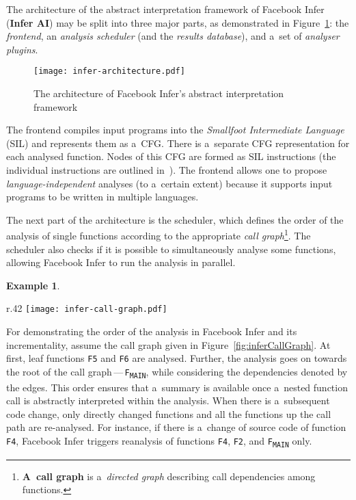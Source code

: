 \documentclass{ExcelAtFIT}
\theoremstyle{definition}
\newtheorem{example}{Example}[section]
\begin{document}
The architecture of the abstract interpretation framework of Facebook Infer (\textbf{Infer AI}) may be split into three major parts, as demonstrated in Figure~\ref{fig:inferArch}: the \emph{frontend}, an \emph{analysis scheduler} (and the \emph{results database}), and a~set of \emph{analyser plugins}.

\begin{figure}[hbt]
    \centering
    \texttt{[image: infer-architecture.pdf]}
    \caption{The architecture of Facebook Infer's abstract interpretation framework~\cite{harmimBP}}
    \label{fig:inferArch}
\end{figure}

The frontend compiles input programs into the \emph{Smallfoot Intermediate Language} (SIL) and represents them as a~CFG. There is a~separate CFG representation for each analysed function. Nodes of this CFG are formed as SIL instructions (the individual instructions are outlined in~\cite{harmimBP}). The frontend allows one to propose \emph{language-independent} analyses (to a~certain extent) because it supports input programs to be written in multiple languages.

The next part of the architecture is the scheduler, which defines the order of the analysis of single functions according to the appropriate \emph{call graph}\footnote{\textbf{A~call graph} is a~\emph{directed graph} describing call dependencies among functions.}. The scheduler also checks if it is possible to simultaneously analyse some functions, allowing Facebook Infer to run the analysis in parallel.

\begin{example}
    \label{ex:inferAnalysis}
\end{example}
\vspace{-.5em}
\noindent
\begin{wrapfigure}{r}{.42 \linewidth}
    \centering
    \vspace{-1em}
    \texttt{[image: infer-call-graph.pdf]}
    \label{fig:inferCallGraph}
\end{wrapfigure}
For demonstrating the order of the analysis in Facebook Infer and its incrementality, assume the call graph given in Figure~\ref{fig:inferCallGraph}. At first, leaf functions \texttt{F5} and \texttt{F6} are analysed. Further, the analysis goes on towards the root of the call graph\,---\,\texttt{F\textsubscript{MAIN}}, while considering the dependencies denoted by the edges. This order ensures that a~summary is available once a~nested function call is abstractly interpreted within the analysis. When there is a~subsequent code change, only directly changed functions and all the functions up the call path are re-analysed. For instance, if there is a~change of source code of function \texttt{F4}, Facebook Infer triggers reanalysis of functions \texttt{F4}, \texttt{F2}, and \texttt{F\textsubscript{MAIN}} only.
\end{document}
